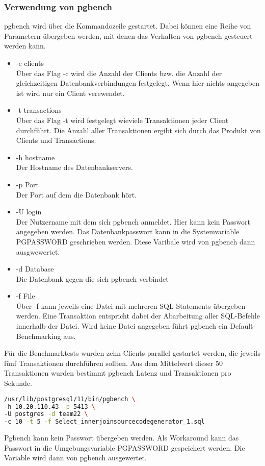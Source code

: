 \subsubsection{Verwendung von pgbench}
pgbench wird über die Kommandozeile gestartet. Dabei können eine Reihe von Parametern übergeben werden, mit denen das Verhalten von pgbench gesteuert werden kann.
\begin{itemize}
	\item -c clients  \\
	Über das Flag -c wird die Anzahl der Clients bzw. die Anzahl der gleichzeitigen Datenbankverbindungen festgelegt. Wenn hier nichts angegeben ist wird nur ein Client verewendet.
	\item -t transactions \\
	Über das Flag -t wird festgelegt wieviele Transaktionen jeder Client durchführt. Die Anzahl aller Transaktionen ergibt sich durch das Produkt von Clients und Transactions.
	\item -h hostname \\
	Der Hostname des Datenbankservers.
	\item -p Port \\
	Der Port auf dem die Datenbank hört.
	\item -U login \\
	Der Nutzername mit dem sich pgbench anmeldet. Hier kann kein Passwort angegeben werden. Das Datenbankpasswort kann in die Systemvariable PGPASSWORD geschrieben werden. Diese Varibale wird von pgbench dann ausgwewertet.
	\item -d Database \\
	Die Datenbank gegen die sich pgbench verbindet
	\item -f File \\ 
	Über -f kann jeweils eine Datei mit mehreren SQL-Statements übergeben werden. Eine Transaktion entspricht dabei der Abarbeitung aller SQL-Befehle innerhalb der Datei.
	Wird keine Datei angegeben führt pgbench ein Default-Benchmarking aus.

\end{itemize}
Für die Benchmarktests wurden zehn Clients parallel gestartet werden, die jeweils fünf Transaktionen durchführen sollten. Aus dem Mittelwert dieser 50 Transaktionen wurden bestimmt pgbench Latenz und Transaktionen pro Sekunde.

\begin{lstlisting}[language=bash,caption = pgbench Statment,frame=single, label={lineInQueryPlan} ]
/usr/lib/postgresql/11/bin/pgbench \ 
-h 10.20.110.43 -p 5413 \ 
-U postgres -d team22 \ 
-c 10 -t 5 -f Select_innerjoinsourcecodegenerator_1.sql
\end{lstlisting}
Pgbench kann kein Passwort übergeben werden. Als Workaround kann das Passwort in die Umgebungsvariable PGPASSWORD gespeichert werden. Die Variable wird dann von pgbench ausgewertet. 
